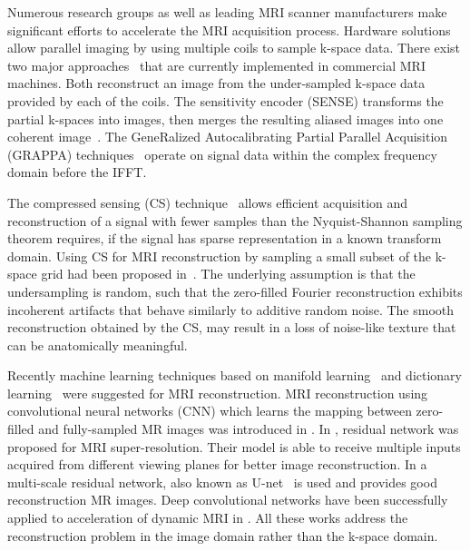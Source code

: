 \documentclass[review]{elsarticle}
\begin{document}
Numerous research groups as well as leading MRI scanner manufacturers make significant efforts to accelerate the MRI acquisition process. Hardware solutions allow parallel imaging by using multiple coils \cite{roemer1990nmr} to sample k-space data. There exist two major approaches~\cite{Deshmane2012} that are currently implemented in commercial MRI machines. Both reconstruct an image from the under-sampled k-space data provided by each of the coils. The sensitivity encoder (SENSE) transforms the partial k-spaces into images, then merges the resulting aliased images into one coherent image~\cite{pruessmann1999sense}. 
The GeneRalized Autocalibrating Partial Parallel Acquisition (GRAPPA) techniques~\cite{griswold2002generalized} operate on signal data within the complex frequency domain before the IFFT.

The compressed sensing (CS) technique~\cite{donoho2006compressed} allows efficient acquisition and reconstruction of a signal with fewer samples than the Nyquist-Shannon sampling theorem requires, if the signal has sparse representation in a known transform domain. Using CS for MRI reconstruction by sampling a small subset of the k-space grid had been proposed in~\cite{lustig2007sparse}. The underlying assumption is that the undersampling is random, such that the zero-filled Fourier reconstruction exhibits incoherent artifacts that behave similarly to additive random noise. 
The smooth reconstruction obtained by the CS, may result in a loss of noise-like texture that can be anatomically meaningful.
 

Recently machine learning techniques based on manifold learning~\cite{usman2014compressive,bhatia2015fast} and dictionary learning~\cite{ravishankar2011mr,caballero2014dictionary} were suggested for MRI reconstruction. MRI reconstruction using convolutional neural networks (CNN) which learns the mapping between zero-filled and fully-sampled MR images was introduced in \cite{wang2016accelerating}. In \cite{Oktay2016}, residual network was proposed for MRI super-resolution. Their model is able to receive multiple inputs acquired from different viewing planes for better image reconstruction. In \cite{lee2017deep,hyun2017deep} a multi-scale residual network, also known as U-net~\cite{ronneberger2015u} is used and provides good reconstruction MR images.
Deep convolutional networks have been successfully applied to acceleration of dynamic MRI in \cite{sandinodeep}. All these works address the reconstruction problem in the image domain rather than the k-space domain.
\end{document}
